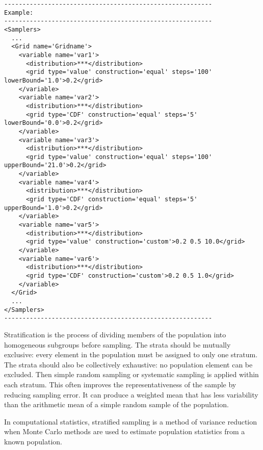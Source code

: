 \begin{lstlisting}[style=XML]
---------------------------------------------------------
Example:
---------------------------------------------------------
<Samplers>
  ...
  <Grid name='Gridname'> 
    <variable name='var1'> 
      <distribution>***</distribution>
      <grid	type='value' construction='equal' steps='100' lowerBound='1.0'>0.2</grid>	
    </variable> 
    <variable name='var2'> 
      <distribution>***</distribution>
      <grid	type='CDF' construction='equal' steps='5' lowerBound='0.0'>0.2</grid>	
    </variable>
    <variable name='var3'> 
      <distribution>***</distribution>
      <grid	type='value' construction='equal' steps='100' upperBound='21.0'>0.2</grid>	
    </variable> 
    <variable name='var4'> 
      <distribution>***</distribution>
      <grid	type='CDF' construction='equal' steps='5' upperBound='1.0'>0.2</grid>	
    </variable>
    <variable name='var5'> 
      <distribution>***</distribution>
      <grid	type='value' construction='custom'>0.2 0.5 10.0</grid>	
    </variable> 
    <variable name='var6'> 
      <distribution>***</distribution>
      <grid	type='CDF' construction='custom'>0.2 0.5 1.0</grid>	
    </variable>
  </Grid>
  ...
</Samplers>
---------------------------------------------------------
\end{lstlisting}
 Stratification is the process of dividing members of the population into homogeneous subgroups before sampling. The strata should be mutually exclusive: every element in the population must be assigned to only one stratum. The strata should also be collectively exhaustive: no population element can be excluded. Then simple random sampling or systematic sampling is applied within each stratum. This often improves the representativeness of the sample by reducing sampling error. It can produce a weighted mean that has less variability than the arithmetic mean of a simple random sample of the population.

In computational statistics, stratified sampling is a method of variance reduction when Monte Carlo methods are used to estimate population statistics from a known population.

